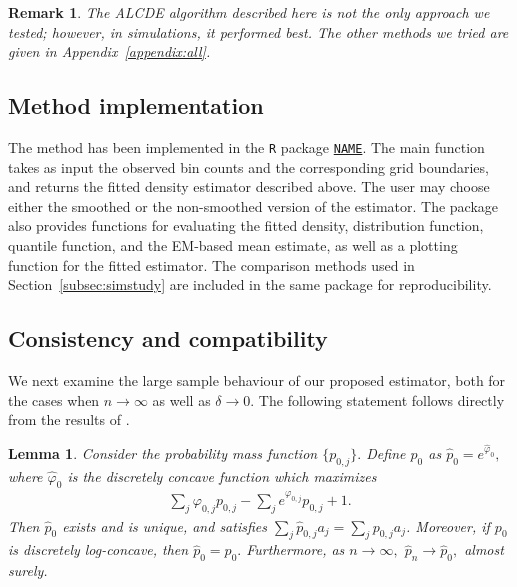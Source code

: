 \documentclass[12pt]{article} %
\newtheorem{lemma}[theorem]{Lemma}
\newtheorem{remark}[theorem]{Remark}
\newcommand{\comH}[1]{{\noindent \color{blue}#1}}
\newcommand{\comF}[1]{{\noindent \color{purple}#1}}
\begin{document}
\begin{remark}
The ALCDE algorithm described here is not the only approach we tested; however, in simulations, it performed best. The other methods we tried are given in Appendix~\ref{appendix:all}.
\end{remark}


\subsection{Method implementation}

The method has been implemented in the \texttt{R} package \href{https://github.com/FurkanDanisman/DensOLog/tree/package-format}{\texttt{NAME}}. The main function takes as input the observed bin counts and the corresponding grid boundaries, and returns the fitted density estimator described above.  The user may choose either the smoothed or the non-smoothed version of the estimator. The package also provides functions for evaluating the fitted density, distribution function, quantile function, and the EM-based mean estimate, as well as a plotting function for the fitted estimator. The comparison methods used in Section~\ref{subsec:simstudy} are included in the same package for reproducibility.

\subsection{Consistency and compatibility}\label{sec:consistent}



We next examine the large sample behaviour of our proposed estimator, both for the cases when $n\rightarrow \infty$ as well as $\delta\rightarrow 0.$   
The following statement follows directly from the results of \citet{JankowskiDiscr2013}.
\begin{lemma}\label{lem:discrete_part}
Consider the probability mass function $\{p_{0,j}\}.$  Define $\widehat p_0$ as $\widehat p_0=e^{\widehat \varphi_0},$ where $\widehat \varphi_0$ is the discretely concave function which maximizes 
\begin{eqnarray*}
\sum_j \varphi_{0,j} p_{0,j} - \sum_j e^{\varphi_{0,j}} p_{0,j} +1.
\end{eqnarray*}
Then $\widehat p_0$ exists and is unique, and satisfies $\sum_j \widehat p_{0,j} a_j = \sum_j p_{0,j} a_j$.   Moreover, if $p_{0}$ is discretely log-concave, then $\widehat p_0=p_0.$  Furthermore, as $n\rightarrow \infty,$  $\widehat p_n \rightarrow \widehat p_0,$ almost surely. 
\end{lemma}
\end{document}
